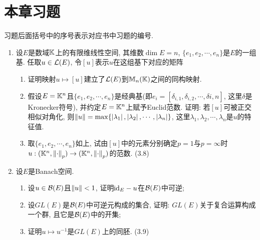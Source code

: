 \section*{本章习题}
	
	习题后面括号中的序号表示对应书中习题的编号.
	
	\begin{enumerate}
	\item 设$ E $是数域$ \mathbb{K} $上的有限维线性空间, 其维数$ \dim E=n $, $ \{ e_1,e_2,\cdots,e_n \} $是$ E $的一组基. 任取$ u\in\mathcal{L}(E) $, 令$ [u] $表示$ u $在这组基下对应的矩阵
		\begin{enumerate}[(1)]
		\item 证明映射$ u\mapsto[u] $建立了$ \mathcal{L}(E) $到$ \mathbb{M}_n(\mathbb{K}) $之间的同构映射.
		\item 假设$ E=\mathbb{K}^n $且$ \{ e_1,e_2,\cdots,e_n \} $是经典基(即$ e_i=[\delta_{i,1},\delta_{i,2},\cdots,\delta{i,n}] $, 这里$ \delta $是Kronecker符号), 并约定$ E=\mathbb{K}^n $上赋予Euclid范数. 证明: 若$ [u] $可被正交相似对角化, 则$ \left\| u \right\|=\max\{ \left| \lambda_1 \right| ,\left| \lambda_2 \right| ,\cdots,\left| \lambda_n \right|  \} $, 这里$ \lambda_1,\lambda_2,\cdots,\lambda_n $是$ u $的特征值.
		\item 取$ \{ e_1,e_2,\cdots,e_n \} $如上, 试由$ [u] $中的元素分别确定$ p=1 $与$ p=\infty $时$ u : (\mathbb{K}^n,\left\| \cdot \right\|_p)\to(\mathbb{K}^n,\left\| \cdot \right\|_p) $的范数. (3.8)
		\end{enumerate}
	\item 设$ E $是Banach空间.
		\begin{enumerate}[(1)]
		\item 设$ u\in\mathcal{B}(E) $且$ \left\| u \right\|<1 $, 证明$ \mathrm{id}_E-u $在$ \mathcal{B}(E) $中可逆;
		\item 设$ GL(E) $是$ \mathcal{B}(E) $中可逆元构成的集合, 证明: $ GL(E) $关于复合运算构成一个群, 且它是$ \mathcal{B}(E) $中的开集;
		\item 证明$ u\mapsto u^{-1} $是$ GL(E) $上的同胚. (3.9)
		\end{enumerate}
	\end{enumerate}
	
